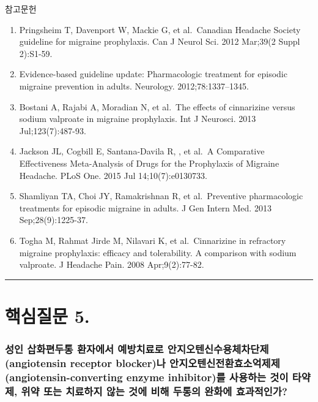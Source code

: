 \documentclass[]{book}
\begin{document}
참고문헌

\begin{enumerate}
\def\labelenumi{\arabic{enumi}.}
\item
  Pringsheim T, Davenport W, Mackie G, et al.~Canadian Headache Society guideline for migraine prophylaxis. Can J Neurol Sci. 2012 Mar;39(2 Suppl 2):S1-59.
\item
  Evidence-based guideline update: Pharmacologic treatment for episodic migraine prevention in adults. Neurology. 2012;78:1337--1345.
\item
  Bostani A, Rajabi A, Moradian N, et al.~The effects of cinnarizine versus sodium valproate in migraine prophylaxis. Int J Neurosci. 2013 Jul;123(7):487-93.
\item
  Jackson JL, Cogbill E, Santana-Davila R, , et al.~A Comparative Effectiveness Meta-Analysis of Drugs for the Prophylaxis of Migraine Headache. PLoS One. 2015 Jul 14;10(7):e0130733.
\item
  Shamliyan TA, Choi JY, Ramakrishnan R, et al.~Preventive pharmacologic treatments for episodic migraine in adults. J Gen Intern Med. 2013 Sep;28(9):1225-37.
\item
  Togha M, Rahmat Jirde M, Nilavari K, et al.~Cinnarizine in refractory migraine prophylaxis: efficacy and tolerability. A comparison with sodium valproate. J Headache Pain. 2008 Apr;9(2):77-82.
\end{enumerate}

\begin{center}\rule{0.5\linewidth}{\linethickness}\end{center}

\hypertarget{section-15}{%
\section{핵심질문 5.}\label{section-15}}

\hypertarget{angiotensin-receptor-blocker-angiotensin-converting-enzyme-inhibitor------------}{%
\subsubsection*{성인 삽화편두통 환자에서 예방치료로 안지오텐신수용체차단제(angiotensin receptor blocker)나 안지오텐신전환효소억제제(angiotensin-converting enzyme inhibitor)를 사용하는 것이 타약제, 위약 또는 치료하지 않는 것에 비해 두통의 완화에 효과적인가?}\label{angiotensin-receptor-blocker-angiotensin-converting-enzyme-inhibitor------------}}
\end{document}
